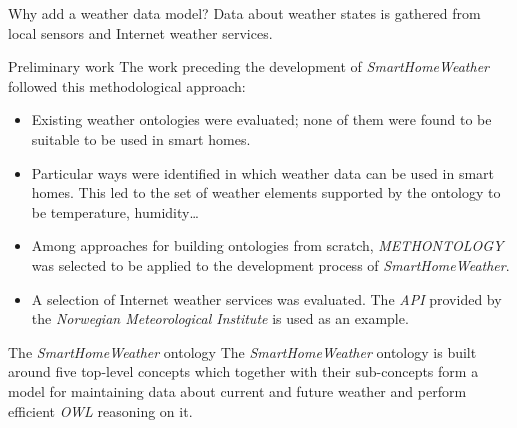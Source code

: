 \documentclass[final,hyperref={pdfpagelabels=true}]{beamer}
\begin{document}
\begin{frame}[fragile]
\begin{columns}[t]
\begin{column}{.45\textwidth}
\begin{block}{Why add a weather data model?}
	Data about weather states is gathered from local sensors and Internet weather services.
      \end{block}

      \begin{block}{Preliminary work}
	The work preceding the development of \emph{SmartHomeWeather} followed this methodological approach:
	\begin{itemize}
	  \item Existing weather ontologies were evaluated; none of them were found to be suitable to be used in smart homes.
	  \item Particular ways were identified in which weather data can be used in smart homes. This led to the set of weather elements supported by the ontology to be temperature, humidity… %
	  \item Among approaches for building ontologies from scratch, \emph{METHONTOLOGY}~\cite{Methontology} was selected to be applied to the development process of \emph{SmartHomeWeather}.
	  \item A selection of Internet weather services was evaluated. The \emph{API} provided by the \emph{Norwegian Meteorological Institute} is used as an example.
	\end{itemize}
      \end{block}

      \begin{block}{The \emph{SmartHomeWeather} ontology}
	The \emph{SmartHomeWeather} ontology is built around five top-level concepts which together with their sub-concepts form a model for maintaining data about current and future weather and perform efficient \emph{OWL} reasoning on it.
      \end{block}
    \end{column}


\end{columns}
\end{frame}
\end{document}
